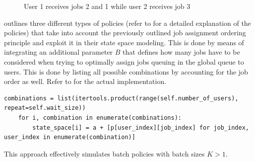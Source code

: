 \begin{figure}[!ht]
\begin{minipage}[b]{0.45\textwidth}
		\caption{User 1 receives jobs 2 and 1 while user 2 receives job 3}
		\label{fig:user_job_assignment_order2}
	\end{minipage}
\end{figure}

 outlines three different types of policies (refer to  for a detailed explanation of the policies) that take into account the previously outlined job assignment ordering principle and exploit it in their state space modeling. This is done by means of integrating an additional parameter $B$ that defines how many jobs have to be considered when trying to optimally assign jobs queuing in the global queue to users. This is done by listing all possible combinations by accounting for the job order as well. Refer to  for the actual implementation.

\begin{lstlisting}[caption=State space modeling by considering $B$ jobs from the global queue and integrating all possible combinations,label=lst:wz_combinations,style=CustomPython]
	combinations = list(itertools.product(range(self.number_of_users), repeat=self.wait_size))
    for i, combination in enumerate(combinations):
        state_space[i] = a + [p[user_index][job_index] for job_index, user_index in enumerate(combination)]
\end{lstlisting}

This approach effectively simulates batch policies with batch sizes $K>1$.